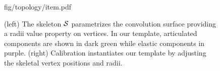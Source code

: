 \begin{figure}[t!]
\centering
\begin{overpic} 
[width=\linewidth]
{fig/topology/item.pdf}
\end{overpic}
\caption{
% 
% 
(left) The skeleton $\mathcal{S}$ parametrizes the convolution surface providing a radii value property on vertices. 
In our template, articulated components are shown in {\color{darkgreen} dark green} while elastic components in {\color{purple}purple}.
% 
(right) Calibration instantiates our template by adjusting the skeletal vertex positions and radii. 
% 
% 
}
\label{fig:topology}
\end{figure}